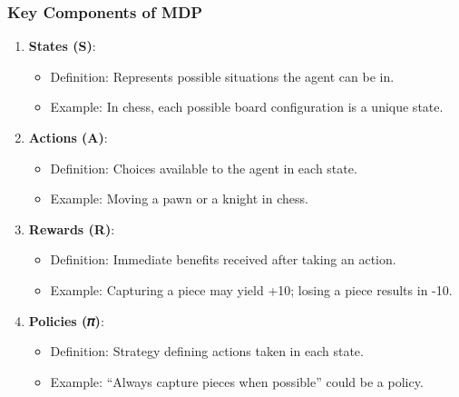 \documentclass[aspectratio=169]{beamer}
\begin{document}
\begin{frame}[fragile]
    \frametitle{Key Components of MDP}
    \begin{enumerate}
        \item \textbf{States (S)}:
        \begin{itemize}
            \item Definition: Represents possible situations the agent can be in.
            \item Example: In chess, each possible board configuration is a unique state.
        \end{itemize}
        
        \item \textbf{Actions (A)}:
        \begin{itemize}
            \item Definition: Choices available to the agent in each state.
            \item Example: Moving a pawn or a knight in chess.
        \end{itemize}
        
        \item \textbf{Rewards (R)}:
        \begin{itemize}
            \item Definition: Immediate benefits received after taking an action.
            \item Example: Capturing a piece may yield +10; losing a piece results in -10.
        \end{itemize}
        
        \item \textbf{Policies (𝜋)}:
        \begin{itemize}
            \item Definition: Strategy defining actions taken in each state.
            \item Example: “Always capture pieces when possible” could be a policy.
        \end{itemize}
    \end{enumerate}
\end{frame}
\end{document}
